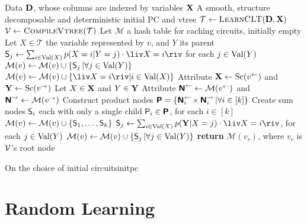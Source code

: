 \begin{algorithm}[t]
  \caption{}\label{alg:strudelinit}
  \begin{algorithmic}[1]
    \Require Data $\mathbf{D}$, whose columns are indexed by variables $\mathbf{X}$
    \Ensure A smooth, structure decomposable and deterministic initial PC and vtree
    \State $\mathcal{T}\gets\textproc{LearnCLT}(\set{D},\set{X})$
    \State $\vtree\gets\textproc{CompileVtree}(\mathcal{T})$
    \State Let $\mathcal{M}$ a hash table for caching circuits, initially empty
        \State Let $X\in\mathcal{T}$ the variable represented by $v$, and $Y$ its parent
          \State $\Sum_j\gets\sum_{i\in\Val(X)}p(X=i|Y=j)\cdot\liv X=i\riv$ for each $j\in\operatorname*{\normalfont{Val}}(Y)$
          \State $\mathcal{M}(v)\gets\mathcal{M}(v)\cup\{\operatorname{\textsf{S}}_j|\forall j\in\operatorname*{\normalfont{Val}}(Y)\}$
        \Else
          \State $\mathcal{M}(v)\gets\mathcal{M}(v)\cup\{\liv X=i\riv|i\in\Val(X)\}$
        \EndIf
      \Else
        \State Attribute $\mathbf{X}\gets\operatorname*{\normalfont{Sc}}(v^\gets)$ and $\mathbf{Y}\gets\operatorname*{\normalfont{Sc}}(v^\to)$
        \State Let $X\in\mathbf{X}$ and $Y\in\mathbf{Y}$
        \State Attribute $\operatorname{\textsf{\textbf{N}}}^\gets\gets\mathcal{M}(v^\gets)$ and $\operatorname{\textsf{\textbf{N}}}^\to\gets\mathcal{M}(v^\to)$
        \State Construct product nodes $\operatorname{\textsf{\textbf{P}}}=\{\operatorname{\textsf{\textbf{N}}}_i^\gets\times\operatorname{\textsf{\textbf{N}}}_i^\to|\forall i\in\left[k\right]\}$
          \State Create sum nodes $\operatorname{\textsf{S}}_i$ each with only a single child $\operatorname{\textsf{P}}_i\in\operatorname{\textsf{\textbf{P}}}$, for each $i\in\left[k\right]$
          \State $\mathcal{M}(v)\gets\mathcal{M}(v)\cup\{\operatorname{\textsf{S}}_1,\ldots,\operatorname{\textsf{S}}_k\}$
        \Else
          \State $\Sum_j\gets\sum_{i\in\Val(X)}p(\set{Y}|X=j)\cdot\liv X=i\riv$, for each $j\in\operatorname*{\normalfont{Val}}(Y)$
          \State $\mathcal{M}(v)\gets\mathcal{M}(v)\cup\{\operatorname{\textsf{S}}_j|\forall j\in\operatorname*{\normalfont{Val}}(Y)\}$
        \EndIf
      \EndIf
    \EndFor
    \State \textbf{return} $\mathcal{M}(v_r)$, where $v_r$ is $\operatorname{\mathcal{V}}$'s root node
  \end{algorithmic}
\end{algorithm}
\begin{remark}[breakable]{On the choice of initial circuits}{initpc}
  \citep{choi13,oztok15,choi17,shen17}
\end{remark}

\section{Random Learning}
\label{sec:random}
